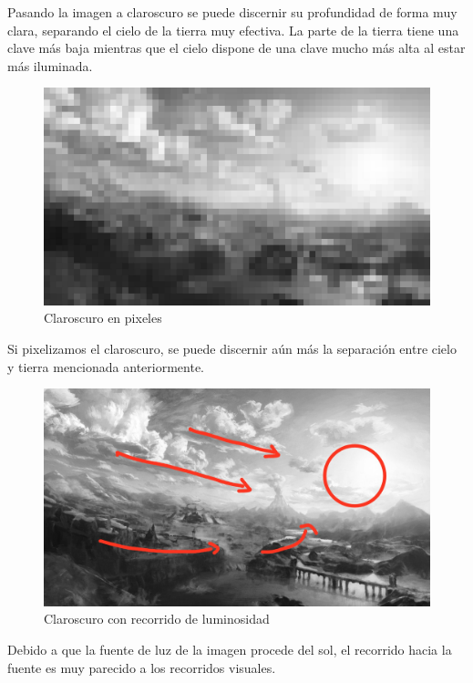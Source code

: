 \documentclass[12pt]{article}
\begin{document}
          Pasando la imagen a claroscuro se puede discernir su profundidad de forma muy clara, separando el cielo de la tierra muy efectiva. 
          La parte de la tierra tiene una clave más baja mientras que el cielo dispone de una clave mucho más alta al estar más iluminada. 
          \newpage
          \begin{figure}[H]
            \centering
            \includegraphics[scale = 0.2]{Jesus/Seccion2/pixel.jpg}
            \caption{Claroscuro en pixeles}
          \end{figure}
          Si pixelizamos el claroscuro, se puede discernir aún más la separación entre cielo y tierra mencionada anteriormente. 
          \newpage
          \begin{figure}[H]
            \centering
            \includegraphics[scale = 0.2]{Jesus/Seccion2/Clarocuro con recorridos.jpg}
            \caption{Claroscuro con recorrido de luminosidad}
          \end{figure}
          Debido a que la fuente de luz de la imagen procede del sol, el recorrido hacia la fuente es muy parecido a los recorridos visuales. 
          \newpage
\end{document}
